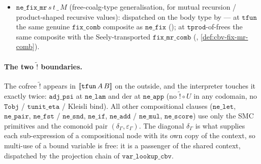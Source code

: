 \begin{itemize}
\[        \;\circ\;
      \mathtt{adj\_psi}\bigl(\mathtt{tensor\_curry}\,\sem{M}\bigr),
      \qquad
      L = U\sem{t_1} \multimap U\sem{t_2},
    \]
    the seeded value-fixpoint combinator of \autoref{thm:cbv-fix-comb}
    post-composed with the inlined $\mathtt{ne\_lam}$ packaging of the
    body (\autoref{def:cbv-fix-clause}, definitional pin
    ). The body $\sem{M}$ is
    interpreted in the context extended by the self-reference
    $s : \mathtt{tfun}\,t_1\,t_2$.
  \item $\mathtt{ne\_fix\_mr}\,s\,t\,\_\,M$ (free-coalg-type
    generalisation, for mutual recursion / product-shaped recursive
    values): dispatched on the body type by
     --- at
    $\mathtt{tfun}$ the same genuine $\mathtt{fix\_comb}$ composite as
    $\mathtt{ne\_fix}$
    (); at
    $\mathtt{tprod}$-of-frees the same composite with the
    Seely-transported $\mathtt{fix\_mr\_comb}$
    (,
    \autoref{def:cbv-fix-mr-comb}).
\end{itemize}

\paragraph{The two $\widetilde{\mathord{!}}$ boundaries.}
The cofree $\widetilde{\mathord{!}}$ appears in
$[\![ \mathtt{tfun}\,A\,B ]\!]$ on the outside, and the interpreter
touches it exactly twice: $\mathtt{adj\_psi}$ at $\mathtt{ne\_lam}$ and
$\mathrm{der}$ at $\mathtt{ne\_app}$ (no $\widetilde{\mathord{!}}\circ
U$ in any codomain, no $\mathtt{Tobj}$ / $\mathtt{tunit\_eta}$ /
Kleisli bind). All
other compositional clauses ($\mathtt{ne\_let}$, $\mathtt{ne\_pair}$,
$\mathtt{ne\_fst}$ / $\mathtt{ne\_snd}$, $\mathtt{ne\_if}$,
$\mathtt{ne\_add}$ / $\mathtt{ne\_mul}$, $\mathtt{ne\_score}$) use only
the SMC primitives and the comonoid pair
$(\delta_\Gamma, \varepsilon_\Gamma)$. The diagonal $\delta_\Gamma$ is
what supplies each sub-expression of a compositional node with its own
copy of the context, so multi-use of a bound variable is free: it is a
passenger of the shared context, dispatched by the projection chain of
$\mathtt{var\_lookup\_cbv}$.


